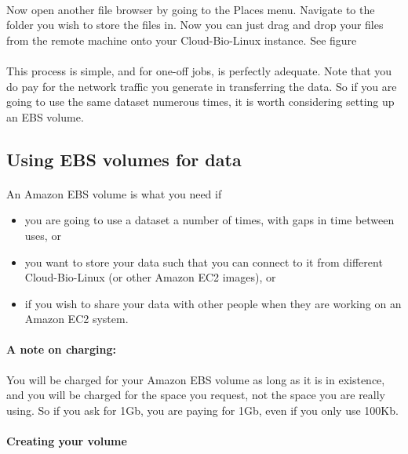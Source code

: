 \paragraph{}Now open another file browser by going to the Places menu. Navigate to the folder you wish to store the files in. Now you can just drag and drop your files from the remote machine onto your Cloud-Bio-Linux instance. See figure




\paragraph{}This process is simple, and for one-off jobs, is perfectly adequate. Note that you do pay for the network traffic you generate in transferring the data. So if you are going to use the same dataset numerous times, it is worth considering setting up an EBS volume.

\subsection{Using EBS volumes for data}

\paragraph{}An Amazon EBS volume is what you need if 
\begin{itemize}
\item you are going to use a dataset a number of times, with gaps in time between uses, or
\item you want to store your data such that you can connect to it from different Cloud-Bio-Linux (or other Amazon EC2 images), or
\item if you wish to share your data with other people when they are working on an Amazon EC2 system.
\end{itemize}

\paragraph{A note on charging:}You will be charged for your Amazon EBS volume as long as it is in existence, and you will be charged for the space you request, not the space you are really using. So if you ask for 1Gb, you are paying for 1Gb, even if you only use 100Kb. 

\paragraph{Creating your volume}

